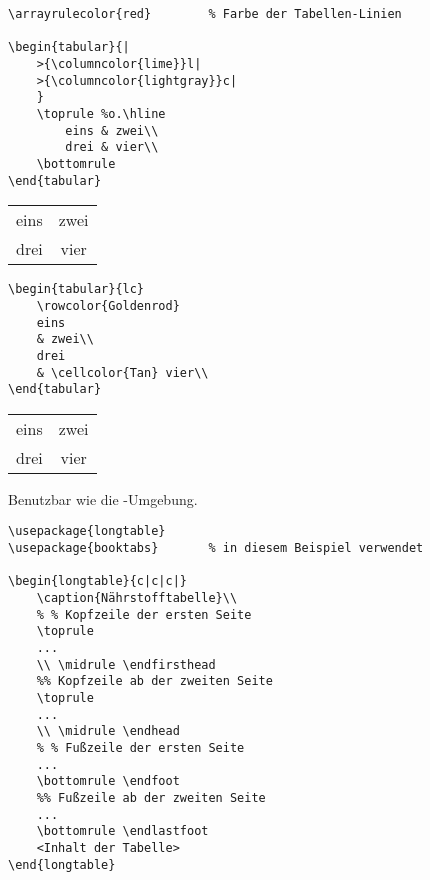 \begin{multicols}{2}
%
\begin{lstlisting}
\arrayrulecolor{red}		% Farbe der Tabellen-Linien

\begin{tabular}{|
	>{\columncolor{lime}}l|
	>{\columncolor{lightgray}}c|
	}
	\toprule %o.\hline
		eins & zwei\\
		drei & vier\\
	\bottomrule
\end{tabular}
\end{lstlisting}

\begin{tabular}{|
	>{\columncolor{lime}}l|
	>{\columncolor{lightgray}}c|
	}
\toprule
eins & zwei\\
drei & vier\\
\bottomrule
\end{tabular}

\columnbreak

\begin{lstlisting}
\begin{tabular}{lc}
	\rowcolor{Goldenrod}
	eins 
	& zwei\\
	drei 
	& \cellcolor{Tan} vier\\
\end{tabular}
\end{lstlisting}

\begin{tabular}{lc}
\toprule
\rowcolor{Goldenrod}eins & zwei\\
drei & \cellcolor{Tan}vier\\
\bottomrule
\end{tabular}


\end{multicols}

Benutzbar wie die -Umgebung.

\begin{lstlisting}
\usepackage{longtable}
\usepackage{booktabs}		% in diesem Beispiel verwendet

\begin{longtable}{c|c|c|}
	\caption{Nährstofftabelle}\\
	% % Kopfzeile der ersten Seite
	\toprule
	...
	\\ \midrule \endfirsthead 
	%% Kopfzeile ab der zweiten Seite
	\toprule
	...
	\\ \midrule \endhead
	% % Fußzeile der ersten Seite
	...
	\bottomrule	\endfoot
	%% Fußzeile ab der zweiten Seite
	...
	\bottomrule \endlastfoot
	<Inhalt der Tabelle>
\end{longtable}
\end{lstlisting}
\negAbstand


